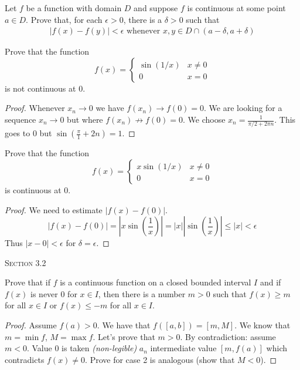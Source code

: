 \documentclass[12pt]{article}
\newenvironment{exercise}[2][Exercise]{\begin{trivlist}
\item[\hskip \labelsep {\bfseries #1}\hskip \labelsep {\bfseries #2.}]}{\end{trivlist}}
\begin{document}
\begin{exercise}{3.1.10}
Let $f$ be a function with domain $D$ and suppose $f$ is continuous at some point $a \in D$. Prove that, for each $\epsilon >0$, there is a $\delta >0$ such that
	\begin{align*}
	|f(x) - f(y) | < \epsilon \text{ whenever } x,y \in D \cap (a-\delta,a+ \delta)
	\end{align*}
\end{exercise}

\begin{exercise}{3.1.11}
    Prove that the function
        \[ f(x)= \begin{cases} \sin (1/x) & x\neq 0 \\ 0 & x =0 \end{cases} \]
    is not continuous at 0.
    
    \begin{proof}
    Whenever $x_n \to 0$ we have $f(x_n) \to f(0) = 0$. We are looking for a sequence $x_n \to 0$ but where $f(x_n) \not\to f(0)=0$. We choose $x_n = \frac{1}{\pi/2 + 2 \pi n}$. This goes to 0 but $\sin(\frac{\pi}{1} +2n)=1$.
    \end{proof}
\end{exercise}



\begin{exercise}{3.1.12}
    Prove that the function
        \[ f(x)= \begin{cases} x \sin(1/x) & x \neq 0 \\ 0 & x=0 \end{cases} \]
    is continuous at 0.
    
    \begin{proof}
    We need to estimate $|f(x)-f(0)|$.
    \[ |f(x)-f(0)| = |x \sin \left(\frac{1}{x} \right)| = |x| |\sin \left( \frac{1}{x} \right)| \leq |x| < \epsilon \]
    Thus $|x-0|<\epsilon$ for $\delta = \epsilon$.
    \end{proof}
\end{exercise}



\begin{center}
\textsc{\Large Section 3.2}
\end{center}


\begin{exercise}{3.2.2}
    Prove that if $f$ is a continuous function on a closed bounded interval $I$ and if $f(x)$ is never 0 for $x \in I$, then there is a number $m>0$ such that $f(x)\geq m$ for all $x \in I$ or $f(x) \leq -m$ for all $x \in I$.
    
    \begin{proof}
    Assume $f(a)>0$. We have that $f([a,b])=[m,M]$. We know that $m=\min f$, $M=\max f$. Let's prove that $m>0$. By contradiction: assume $m<0$. Value 0 is taken \emph{(non-legible)} $a_n$ intermediate value $[m, f(a)]$ which contradicts $f(x)\neq 0$. Prove for case 2 is analogous (show that $M <0$).
    \end{proof}
\end{exercise}
\end{document}
